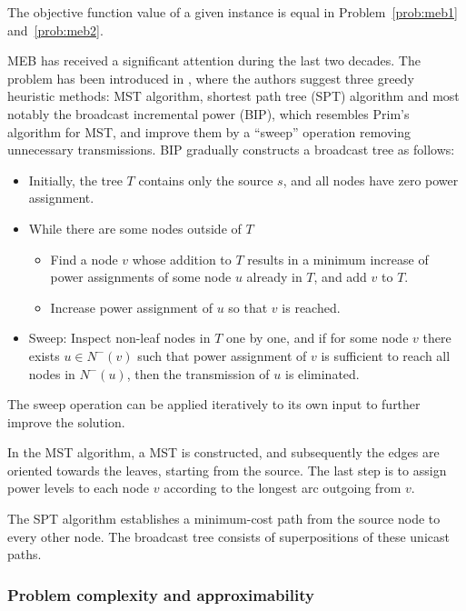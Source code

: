 \begin{observation}
The objective function value of a given instance is equal in Problem~\ref{prob:meb1} and~\ref{prob:meb2}.
\end{observation}

MEB has received a significant attention during the last two decades.
The problem has been introduced in \cite{wieselthier00}, where the authors suggest three greedy heuristic methods:
MST algorithm, shortest path tree (SPT) algorithm and most notably the broadcast incremental power (BIP), which resembles Prim's algorithm for MST,
and improve them by a ``sweep'' operation removing unnecessary transmissions.
BIP gradually constructs a broadcast tree as follows:
\begin{itemize}
\item Initially, the tree $T$ contains only the source $s$, and all nodes have zero power assignment.
\item While there are some nodes outside of $T$
\begin{itemize}
	\item Find a node $v$ whose addition to $T$ results in a minimum increase of power assignments of some node $u$ already in $T$, and add $v$ to $T$.
	\item Increase  power assignment of $u$ so that $v$ is reached.
\end{itemize}
\item Sweep: Inspect non-leaf nodes in $T$ one by one, and if for some node $v$ there exists $u\in N^-(v)$ such that power assignment of $v$ is sufficient to reach all nodes in $N^-(u)$, 
then the transmission of $u$ is eliminated.
\end{itemize}
The sweep operation can be applied iteratively to its own input to further improve the solution.

In the MST algorithm, a MST is constructed, and subsequently the edges are oriented towards the leaves, starting from the source.
The last step is to assign power levels to each node $v$ according to the longest arc outgoing from $v$.

The SPT algorithm establishes a minimum-cost path from the source node to every other node. The broadcast tree consists of superpositions of these unicast paths.

\subsubsection{Problem complexity and approximability}

